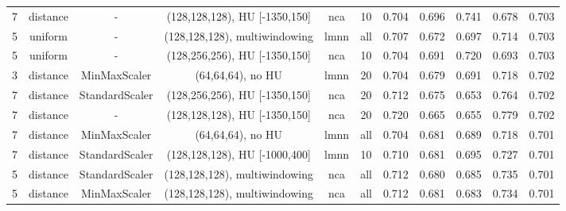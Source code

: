 \begin{sidewaystable}[!htbp]
{\begin{tabular}{ccccccccccc}
7 & distance & - & (128,128,128), HU [-1350,150] & nca & 10 & 0.704 & 0.696 & 0.741 & 0.678 & 0.703 \\
5 & uniform & - & (128,128,128), multiwindowing & lmnn & all & 0.707 & 0.672 & 0.697 & 0.714 & 0.703 \\
5 & uniform & - & (128,256,256), HU [-1350,150] & nca & 10 & 0.704 & 0.691 & 0.720 & 0.693 & 0.703 \\
3 & distance & MinMaxScaler & (64,64,64), no HU & lmnn & 20 & 0.704 & 0.679 & 0.691 & 0.718 & 0.702 \\
7 & distance & StandardScaler & (128,256,256), HU [-1350,150] & nca & 20 & 0.712 & 0.675 & 0.653 & 0.764 & 0.702 \\
7 & distance & - & (128,128,128), HU [-1350,150] & nca & 20 & 0.720 & 0.665 & 0.655 & 0.779 & 0.702 \\
7 & distance & MinMaxScaler & (64,64,64), no HU & lmnn & all & 0.704 & 0.681 & 0.689 & 0.718 & 0.701 \\
7 & distance & StandardScaler & (128,128,128), HU [-1000,400] & lmnn & 10 & 0.710 & 0.681 & 0.695 & 0.727 & 0.701 \\
5 & distance & StandardScaler & (128,128,128), multiwindowing & nca & all & 0.712 & 0.680 & 0.685 & 0.735 & 0.701 \\
5 & distance & MinMaxScaler & (128,128,128), multiwindowing & nca & all & 0.712 & 0.681 & 0.683 & 0.734 & 0.701 \\
\bottomrule
\end{tabular}%
}
\end{sidewaystable}


